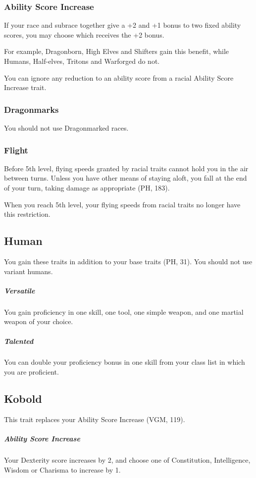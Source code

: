 \documentclass[letterpaper,twocolumn,openany,nodeprecatedcode]{dndbook}
\begin{document}
\subsubsection{Ability Score Increase}
If your race and subrace together give a +2 and +1 bonus to two fixed ability scores, you may choose which receives the +2 bonus.

For example, Dragonborn, High Elves and Shifters gain this benefit, while Humans, Half-elves, Tritons and Warforged do not.

You can ignore any reduction to an ability score from a racial Ability Score Increase trait.

\subsubsection{Dragonmarks} You should not use Dragonmarked races.

\subsubsection{Flight} Before 5th level, flying speeds granted by racial traits cannot hold you in the air between turns. Unless you have other means of staying aloft, you fall at the end of your turn, taking damage as appropriate (PH, 183).

When you reach 5th level, your flying speeds from racial traits no longer have this restriction.

\subsection{Human}
You gain these traits in addition to your base traits (PH, 31). You should not use variant humans.

\subparagraph{Versatile} You gain proficiency in one skill, one tool, one simple weapon, and one martial weapon of your choice.
\subparagraph{Talented} You can double your proficiency bonus in one skill from your class list in which you are proficient.

\subsection{Kobold}
This trait replaces your Ability Score Increase (VGM, 119).

\subparagraph{Ability Score Increase} Your Dexterity score increases by 2, and choose one of Constitution, Intelligence, Wisdom or Charisma to increase by 1.
\end{document}
